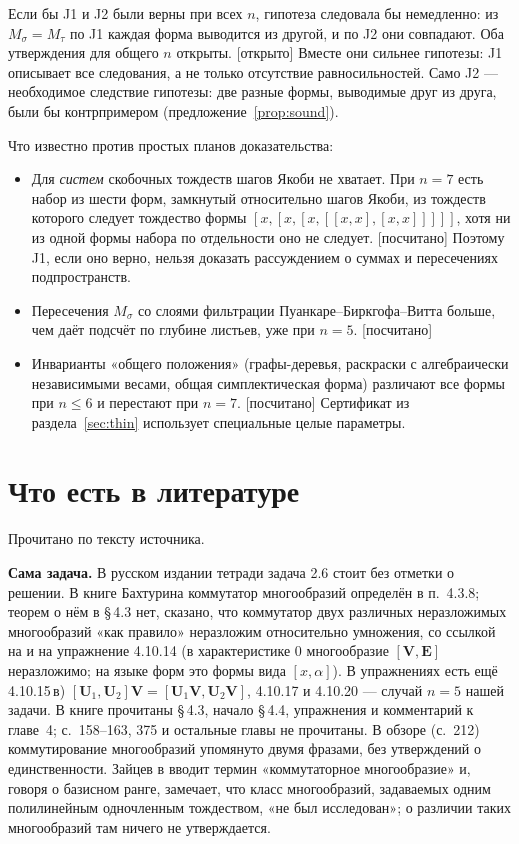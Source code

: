 \documentclass[11pt]{article}
\newcommand{\stat}[1]{\textsf{\small[#1]}}
\newcommand{\computed}{\stat{посчитано}}
\newcommand{\open}{\stat{открыто}}
\theoremstyle{plain}
\theoremstyle{definition}
\theoremstyle{remark}
\begin{document}
Если бы J1 и J2 были верны при всех $n$, гипотеза следовала бы немедленно: из $M_\sigma=M_\tau$ по J1 каждая форма выводится из другой, и по J2 они совпадают. Оба утверждения для общего $n$ открыты. \open{} Вместе они сильнее гипотезы: J1 описывает все следования, а не только отсутствие равносильностей. Само J2 --- необходимое следствие гипотезы: две разные формы, выводимые друг из друга, были бы контрпримером (предложение~\ref{prop:sound}).

Что известно против простых планов доказательства:
\begin{itemize}
\item Для \emph{систем} скобочных тождеств шагов Якоби не хватает. При $n=7$ есть набор из шести форм, замкнутый относительно шагов Якоби, из тождеств которого следует тождество формы $[x,[x,[x,[[x,x],[x,x]]]]]$, хотя ни из одной формы набора по отдельности оно не следует. \computed{} Поэтому J1, если оно верно, нельзя доказать рассуждением о суммах и пересечениях подпространств.
\item Пересечения $M_\sigma$ со слоями фильтрации Пуанкаре--Биркгофа--Витта больше, чем даёт подсчёт по глубине листьев, уже при $n=5$. \computed
\item Инварианты «общего положения» (графы-деревья, раскраски с алгебраически независимыми весами, общая симплектическая форма) различают все формы при $n\le6$ и перестают при $n=7$. \computed{} Сертификат из раздела~\ref{sec:thin} использует специальные целые параметры.
\end{itemize}

\section{Что есть в литературе}

Прочитано по тексту источника.

\textbf{Сама задача.} В русском издании тетради \cite{DN} задача 2.6 стоит без отметки о решении. В книге Бахтурина \cite{Bah} коммутатор многообразий определён в п.~4.3.8; теорем о нём в \S\,4.3 нет, сказано, что коммутатор двух различных неразложимых многообразий «как правило» неразложим относительно умножения, со ссылкой на \cite{Z81} и на упражнение 4.10.14 (в характеристике $0$ многообразие $[\mathbf V,\mathbf E]$ неразложимо; на языке форм это формы вида $[x,\alpha]$). В упражнениях есть ещё 4.10.15\,в) $[\mathbf U_1,\mathbf U_2]\mathbf V=[\mathbf U_1\mathbf V,\mathbf U_2\mathbf V]$, 4.10.17 и 4.10.20 --- случай $n=5$ нашей задачи. В книге прочитаны \S\,4.3, начало \S\,4.4, упражнения и комментарий к главе~4; с.~158--163, 375 и остальные главы не прочитаны. В обзоре \cite{BO} (с.~212) коммутирование многообразий упомянуто двумя фразами, без утверждений о единственности. Зайцев в \cite{Z98} вводит термин «коммутаторное многообразие» и, говоря о базисном ранге, замечает, что класс многообразий, задаваемых одним полилинейным одночленным тождеством, «не был исследован»; о различии таких многообразий там ничего не утверждается.
\end{document}
